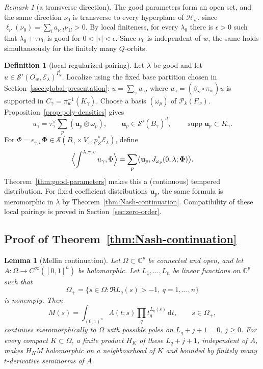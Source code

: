 \documentclass[a4paper,12pt]{amsart}
\numberwithin{equation}{section}
\newtheorem{lemma}[theorem]{Lemma}
\theoremstyle{definition}
\newtheorem{definition}[theorem]{Definition}
\theoremstyle{remark}
\newtheorem{remark}[theorem]{Remark}
\newcommand{\C}{\mathbb C}
\newcommand{\IN}{I_N}
\newcommand{\mcS}{\mathcal S}
\newcommand{\mcE}{\mathcal E}
\newcommand{\mcP}{\mathcal P}
\newcommand{\mcH}{\mathcal H}
\newcommand{\supp}{\operatorname{supp}}
\newcommand{\dd}{\mathrm d}
\begin{document}
\begin{remark}[a transverse direction]\label{rem:transverse}
The good parameters form an open set, and the same direction $\nu_0$ is transverse to every hyperplane of $\mcH_w$, since
$\ell_\nu(\nu_0)=\sum_l a_{\nu,l}\nu_{1l}>0$.
By local finiteness, for every $\lambda_0$ there is $\epsilon>0$ such that $\lambda_0+\tau\nu_0$ is good for $0<|\tau|<\epsilon$. Since $\nu_0$ is independent of $w$, the same holds simultaneously for the finitely many $Q$-orbits.
\end{remark}

\begin{definition}[local regularized pairing]\label{def:local-pairing}
Let $\lambda$ be good and let $u\in\mcS'(O_w,\mcE_\lambda)^{\IN^k}$. Localize using the fixed base partition chosen in Section~\ref{ssec:global-presentation}:
$u=\sum_\gamma u_\gamma$, where $u_\gamma=(\beta_\gamma\circ\pi_w)u$ is supported in $C_\gamma=\pi_w^{-1}(K_\gamma)$. Choose a basis $(\omega_p)$ of $\mcP_k(F_w)$. Proposition~\ref{prop:poly-densities} gives
\[
 u_\gamma=\tau_\gamma^\vee\sum_p(\mathbf u_p\otimes\omega_p),\qquad
 \mathbf u_p\in\mcS'(B_\gamma)^d,\qquad \supp\mathbf u_p\subset K_\gamma.
\]
For $\Phi=\epsilon_{\gamma,v}\boldsymbol\Phi\in\mcS(B_\gamma\times V_x,p_Z^*\mcE_\lambda)$, define
\begin{equation}\label{eq:local-pairing}
 \Bigl\langle\int^{\lambda,\gamma,v}u_\gamma,\Phi\Bigr\rangle
 =\sum_p\bigl\langle\mathbf u_p,J_{\omega_p}(0,\lambda;\boldsymbol\Phi)\bigr\rangle.
\end{equation}
Theorem~\ref{thm:good-parameters} makes this a (continuous) tempered distribution. For fixed coefficient distributions $\mathbf u_p$, the same formula is meromorphic in $\lambda$ by Theorem~\ref{thm:Nash-continuation}. Compatibility of these local pairings is proved in Section~\ref{sec:zero-order}.
\end{definition}

\subsection{Proof of Theorem~\ref{thm:Nash-continuation}}\label{ssec:monomial-proof}

\begin{lemma}[Mellin continuation]\label{lem:Mellin}
Let $\Omega\subset\C^p$ be connected and open, and let $A:\Omega\to C^\infty([0,1]^n)$ be holomorphic. Let $L_1,\ldots,L_n$ be linear functions on $\C^p$ such that
\[
 \Omega_+=\{s\in\Omega:\Re L_q(s)>-1,\ q=1,\ldots,n\}
\]
is nonempty. Then
\[
 M(s)=\int_{(0,1)^n}A(t;s)\prod_qt_q^{L_q(s)}\,\dd t,
 \qquad s\in\Omega_+,
\]
continues meromorphically to $\Omega$ with possible poles on $L_q+j+1=0$, $j\ge0$. For every compact $K\subset\Omega$, a finite product $H_K$ of these $L_q+j+1$, independent of $A$, makes $H_KM$ holomorphic on a neighbourhood of $K$ and bounded by finitely many $t$-derivative seminorms of $A$.
\end{lemma}
\end{document}
